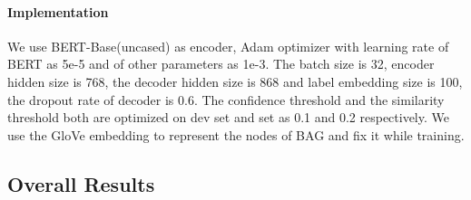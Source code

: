 \documentclass[11pt]{article}
\begin{document}
\paragraph{Implementation} We use BERT-Base(uncased) \citep{DBLP:conf/naacl/DevlinCLT19_bert} as encoder, Adam optimizer \citep{DBLP:journals/corr/KingmaB14_adam} with learning rate of BERT as 5e-5 and of other parameters as 1e-3. The batch size is 32, encoder hidden size is 768, the decoder hidden size is 868 and label embedding size is 100, the dropout rate of decoder is 0.6. The confidence threshold  and the similarity threshold  both are optimized on dev set and set as 0.1 and 0.2 respectively.
 We use the GloVe embedding \citep{DBLP:conf/emnlp/PenningtonSM14_glove} to represent the nodes of BAG and fix it while training.
\subsection{Overall Results}
\begin{table}[!t]
\setlength{\belowcaptionskip}{-0.4cm}
\centering
{}
\caption{Macro P/R/F1 results on Ultra-Fine test set. * means using augmented data. "without label dependency" methods formulated FET as multi-label classification without considering associations between labels. "with label dependency" methods leveraged associations between labels explicitly or implicitly.}
\label{tab:Ultra-Fine main result}
\end{table}
\end{document}
